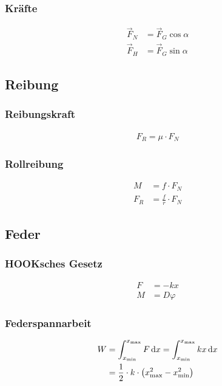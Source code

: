 \subsubsection*{Kräfte}
\begin{align*}
\vec{F}_N&=\vec{F}_G\cos\alpha\\
\vec{F}_H&=\vec{F}_G\sin\alpha
\end{align*}


\subsection{Reibung}

\begin{multicols}{2}{}
\subsubsection*{Reibungskraft}
\begin{align*}
F_R=\mu\cdot F_N
\end{align*}
\vfill
\subsubsection*{Rollreibung}
\begin{align*}
M&=f\cdot F_N\\
F_R&=\frac{f}{r}\cdot F_N
\end{align*}
\vfill
\end{multicols}

\newpage
\subsection{Feder}

\begin{multicols}{2}{}
\subsubsection*{HOOKsches Gesetz}
\begin{align*}
F&=-kx\\
M&=D\varphi
\end{align*}

\subsubsection*{Federspannarbeit}
\begin{align*}
W	&=\int_{x_\text{min}}^{x_\text{max}}F\mathop{}\!\mathrm{d} x=\int_{x_\text{min}}^{x_\text{max}}kx\mathop{}\!\mathrm{d} x\\
	&=\frac{1}{2}\cdot k\cdot \left(x_{\text{max}}^2-x_{\text{min}}^2\right)
\end{align*}
\end{multicols}

